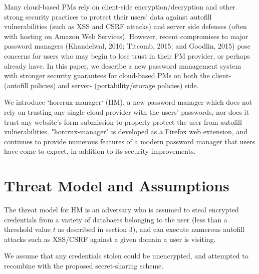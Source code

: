 \documentclass[conference]{IEEEtran}
\begin{document}
Many cloud-based PMs rely on client-side encryption/decryption and other strong
security practices to protect their users' data against autofill vulnerabilities
(such as XSS and CSRF attacks) and server side defenses (often with hosting on
Amazon Web Services). However, recent compromises to major password managers
(Khandelwal, 2016; Titcomb, 2015; and Goodlin, 2015) pose concerns for users who
may begin to lose trust in their PM provider, or perhaps already have. In this
paper, we describe a new password management system with stronger security
guarantees for cloud-based
PMs on both the client- (autofill policies) and server- (portability/storage
policies) side.

We introduce `horcrux-manager` (HM), a new password manager which
does not rely on trusting any single cloud provider with the users' passwords,
nor does it trust any website's form submission to properly protect the user
from autofill vulnerabilities. "horcrux-manager" is developed as a
Firefox web extension, and continues to provide numerous features of
a modern password manager that users have come to expect, in addition to its
security improvements.

\section{Threat Model and Assumptions}
The threat model for HM  is an adversary who is assumed to steal encrypted
credentials from a variety of databases belonging to the user (less than a
threshold value $t$ as described in section 3), and can execute numerous
autofill attacks such as XSS/CSRF against a given domain a user is visiting.  

We assume that any credentials stolen could be unencrypted, and attempted to
recombine with the proposed secret-sharing scheme. 
\end{document}
